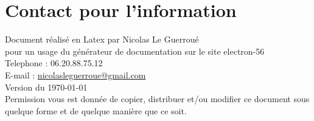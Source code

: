 
\section*{Contact pour l'information}

Document réalisé en Latex par Nicolas Le Guerroué \\
pour un usage du générateur de documentation sur le site electron-56 \\
Telephone : 06.20.88.75.12 \\
E-mail : \href{mailto:nicolasleguerroue@gmail.com}{nicolasleguerroue@gmail.com} \\
Version du \today \\

Permission vous est donnée de copier, distribuer et/ou modifier ce document sous quelque forme et de quelque manière que ce soit.



